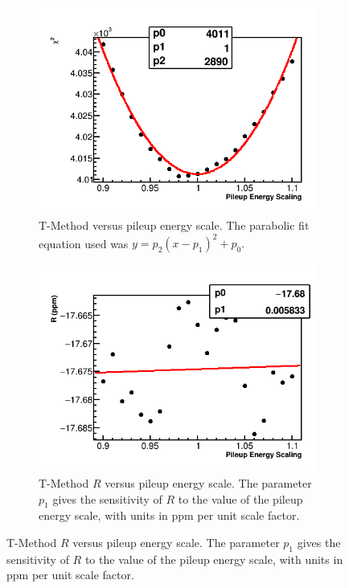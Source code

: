 \begin{figure}[h]
\centering
    \begin{subfigure}[t]{0.45\textwidth}
        \centering
        \includegraphics[width=\textwidth]{TMethod_Chi2_Vs_PileupEnergyScaling_Canv}
        \caption{T-Method \chisq versus pileup energy scale. The parabolic fit equation used was $y = p_{2}(x - p_{1})^{2} + p_{0}.$}
    \end{subfigure}%
    \hspace{1cm}
    \begin{subfigure}[t]{0.45\textwidth}
        \centering
        \includegraphics[width=\textwidth]{TMethod_R_Vs_PileupEnergyScaling_Canv}
        \caption{T-Method $R$ versus pileup energy scale. The parameter $p_{1}$ gives the sensitivity of $R$ to the value of the pileup energy scale, with units in ppm per unit scale factor.}
    \end{subfigure}


\end{figure}
